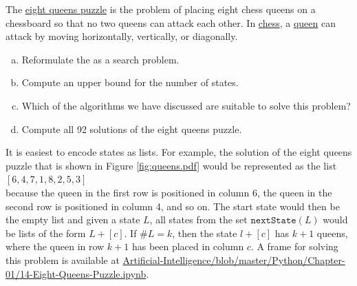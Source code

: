 

\exercise
The \href{https://en.wikipedia.org/wiki/Eight_queens_puzzle}{eight queens puzzle} is the problem of  placing
eight chess queens on a chessboard so that no two queens can attack each other.  In
\href{https://en.wikipedia.org/wiki/Chess}{chess}, a \href{https://en.wikipedia.org/wiki/Queen_(chess)}{queen}
can attack by moving horizontally, vertically, or diagonally.  
\begin{enumerate}[(a)]
\item Reformulate the  as a search problem.
\item Compute an upper bound for the number of states.
\item Which of the algorithms we have discussed are suitable to solve this problem?
\item Compute all 92 solutions of the eight queens puzzle.  
\end{enumerate}

\hint
It is easiest to encode states as lists.  For example, the solution of the eight queens puzzle that is shown in
Figure \ref{fig:queens.pdf} would be represented as the list 
\\[0.2cm]
\hspace*{1.3cm}
$[6, 4, 7, 1, 8, 2, 5, 3]$
\\[0.2cm]
because the queen in the first row is positioned in column 6, the queen in the second row is positioned in
column 4, and so on.  The start state would then be the empty list and given a state $L$, all states from the
set $\mathtt{nextState}(L)$ would be lists of the form $L + [c]$.  If $\#L = k$, then the state $l + [c]$ has
$k+1$ queens, where the queen in row $k+1$ has been placed in column $c$.
A frame for solving this problem is available at
\href{https://github.com/karlstroetmann/Artificial-Intelligence/blob/master/Python/Chapter-01/14-Eight-Queens-Puzzle.ipynb}{Artificial-Intelligence/blob/master/Python/Chapter-01/14-Eight-Queens-Puzzle.ipynb}.


